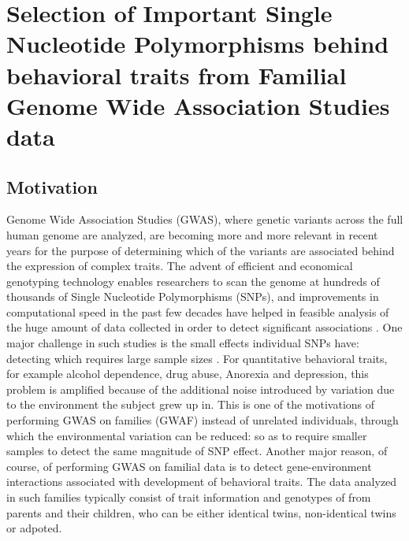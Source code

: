 \section{Selection of Important Single Nucleotide Polymorphisms behind behavioral traits from Familial Genome Wide Association Studies data}
\label{sec:TwinSection}

\subsection{Motivation}
Genome Wide Association Studies (GWAS), where genetic variants across the full human genome are analyzed, are becoming more and more relevant in recent years for the purpose of determining which of the variants are associated behind the expression of complex traits. The advent of efficient and economical genotyping technology enables researchers to scan the genome at hundreds of thousands of Single Nucleotide Polymorphisms (SNPs), and improvements in computational speed in the past few decades have helped in feasible analysis of the huge amount of data collected in order to detect significant associations \citep{VisscherEtal12}. One major challenge in such studies is the small effects individual SNPs have: detecting which requires large sample sizes \citep{ManolioEtal09}. For quantitative behavioral traits, for example alcohol dependence, drug abuse, Anorexia and depression, this problem is amplified because of the additional noise introduced by variation due to the environment the subject grew up in. This is one of the motivations of performing GWAS on families (GWAF) instead of unrelated individuals, through which the environmental variation can be reduced: so as to require smaller samples to detect the same magnitude of SNP effect. Another major reason, of course, of performing GWAS on familial data is to detect gene-environment interactions associated with development of behavioral traits. The data analyzed in such families typically consist of trait information and genotypes of from parents and their children, who can be either identical twins, non-identical twins or adpoted.


